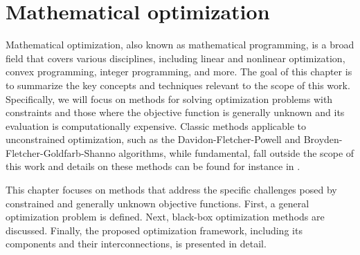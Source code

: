 \chapter{Mathematical optimization}\label{optimization}

Mathematical optimization, also known as mathematical programming, is a broad field that covers various disciplines, including linear and nonlinear optimization, convex programming, integer programming, and more. The goal of this chapter is to summarize the key concepts and techniques relevant to the scope of this work. Specifically, we will focus on methods for solving optimization problems with constraints and those where the objective function is generally unknown and its evaluation is computationally expensive. Classic methods applicable to unconstrained optimization, such as the Davidon-Fletcher-Powell \cite{Fletcher1963} and Broyden-Fletcher-Goldfarb-Shanno \cite{broyden1970} algorithms, while fundamental, fall outside the scope of this work and details on these methods can be found for instance in \cite{Bert}.


This chapter focuses on methods that address the specific challenges posed by constrained and generally unknown objective functions. First, a general optimization problem is defined. Next, black-box optimization methods are discussed. Finally, the proposed optimization framework, including its components and their interconnections, is presented in detail.


%


